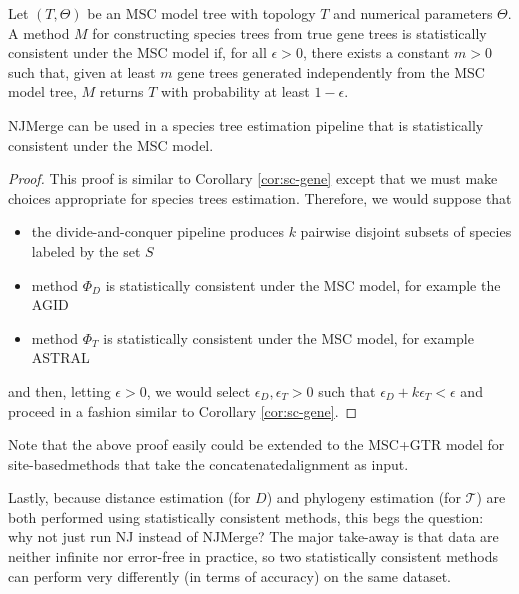 
\begin{definition}
\label{def:sc-species}
Let $(T,\Theta)$ be an MSC model tree with topology $T$ and numerical parameters $\Theta$.
A method $M$ for constructing species trees from true gene trees is statistically consistent under the MSC model if, for all $\epsilon > 0$, there exists a constant $m > 0$ such that, given at least $m$ gene trees generated independently from the MSC model tree, $M$ returns $T$ with probability at least $1 - \epsilon$.
\end{definition}

\begin{corollary}
\label{cor:sc-species}
NJMerge can be used in a species tree estimation pipeline that is statistically consistent under the MSC model.
\end{corollary}
\begin{proof}
This proof is similar to Corollary \ref{cor:sc-gene} except that we must make choices appropriate for species trees estimation.
Therefore, we would suppose that 
\begin{itemize}
	\item the divide-and-conquer pipeline produces $k$ pairwise disjoint subsets of species labeled by the set $S$
	\item method $\Phi_D$ is statistically consistent under the MSC model, for example the \gls{AGID} \cite{allman2018species-internode} 
	\item method $\Phi_T$ is statistically consistent under the MSC model, for example  ASTRAL \cite{mirarab2014astral}
\end{itemize}
and then, letting $\epsilon > 0$, we would select $\epsilon_D, \epsilon_T > 0$ such that $\epsilon_D + k \epsilon_T < \epsilon$ and proceed in a fashion similar to Corollary \ref{cor:sc-gene}.
\end{proof}

Note that the above proof easily could be extended to the \gls{MSC+GTR} model for \glspl{site-basedmethod} that take the \gls{concatenatedalignment} as input.

Lastly, because distance estimation (for $D$) and phylogeny estimation (for $\mathcal{T}$) are both performed using statistically consistent methods, this begs the question: why not just run NJ instead of NJMerge?
The major take-away is that data are neither infinite nor error-free in practice, so two statistically consistent methods can perform very differently (in terms of accuracy) on the same dataset.

